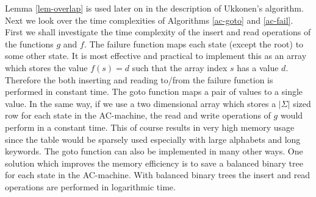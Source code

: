 \documentclass[english,twoside,censored,csm,algorithms-track-2020]{HYthesisML}
\theoremstyle{plain}
\theoremstyle{definition}
\begin{document}
Lemma \ref{lem-overlap} is used later on in the description of Ukkonen's algorithm. Next we look
over the time complexities of Algorithms \ref{ac-goto} and \ref{ac-fail}. First we shall investigate
the time complexity of the insert and read operations of the functions $g$ and $f$. The failure
function maps each state (except the root) to some other state. It is most effective and practical
to implement this as an array which stores the value $f(s)=d$ such that the array index $s$ has
a value $d$. Therefore the both inserting and reading to/from the failure function is performed
in constant time. The goto function maps a pair of values to a single value.
In the same way, if we use a two dimensional array which stores
a $|\Sigma|$ sized row for each state in the AC-machine, the read and write operations of $g$ would
perform in a constant time. This of course results in very high memory usage since the table would be
sparsely used especially with large alphabets and long keywords. The goto function can also
be implemented in many other ways. One solution which improves the memory efficiency is to save
a balanced binary tree for each state in the AC-machine. With balanced binary trees the insert and read
operations are performed in logarithmic time.
\end{document}
